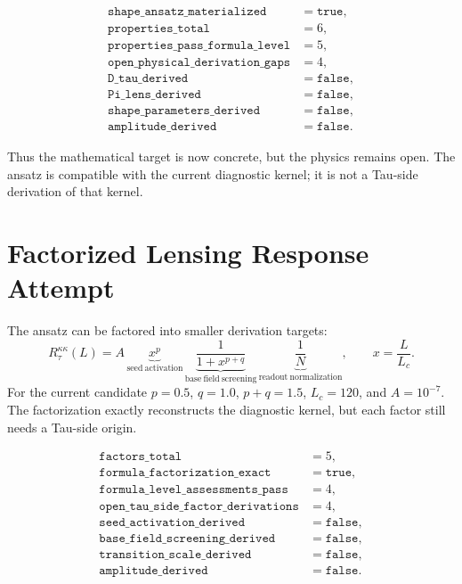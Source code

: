 \documentclass[11pt]{article}
\begin{document}
\[
\begin{array}{ll}
\texttt{shape\_ansatz\_materialized} &= \texttt{true},\\
\texttt{properties\_total} &= 6,\\
\texttt{properties\_pass\_formula\_level} &= 5,\\
\texttt{open\_physical\_derivation\_gaps} &= 4,\\
\texttt{D\_tau\_derived} &= \texttt{false},\\
\texttt{Pi\_lens\_derived} &= \texttt{false},\\
\texttt{shape\_parameters\_derived} &= \texttt{false},\\
\texttt{amplitude\_derived} &= \texttt{false}.
\end{array}
\]

Thus the mathematical target is now concrete, but the physics remains open.
The ansatz is compatible with the current diagnostic kernel; it is not a
Tau-side derivation of that kernel.

\section{Factorized Lensing Response Attempt}

The ansatz can be factored into smaller derivation targets:
\[
R_{\tau}^{\kappa\kappa}(L)
= A\,
\underbrace{x^p}_{\mathrm{seed\ activation}}\,
\underbrace{\frac{1}{1+x^{p+q}}}_{\mathrm{base\ field\ screening}}\,
\underbrace{\frac{1}{N}}_{\mathrm{readout\ normalization}},
\qquad
x=\frac{L}{L_c}.
\]
For the current candidate \(p=0.5\), \(q=1.0\), \(p+q=1.5\),
\(L_c=120\), and \(A=10^{-7}\). The factorization exactly reconstructs the
diagnostic kernel, but each factor still needs a Tau-side origin.

\[
\begin{array}{ll}
\texttt{factors\_total} &= 5,\\
\texttt{formula\_factorization\_exact} &= \texttt{true},\\
\texttt{formula\_level\_assessments\_pass} &= 4,\\
\texttt{open\_tau\_side\_factor\_derivations} &= 4,\\
\texttt{seed\_activation\_derived} &= \texttt{false},\\
\texttt{base\_field\_screening\_derived} &= \texttt{false},\\
\texttt{transition\_scale\_derived} &= \texttt{false},\\
\texttt{amplitude\_derived} &= \texttt{false}.
\end{array}
\]
\end{document}
